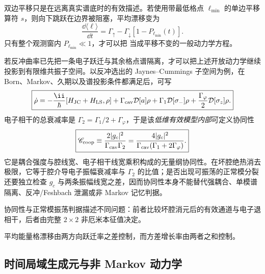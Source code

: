 双边平移只是在远离真实谱底时的有效描述。若使用带最低格点 $\ell_{\min}$ 的单边平移算符 $s$，则向下跳跃在边界被阻塞，平均漂移变为
\[
\frac{\dd\langle\ell\rangle}{\dd t}
=\Gamma_\uparrow
-\Gamma_\downarrow[1-P_{\ell_{\min}}(t)].
\]
只有整个观测窗内 $P_{\ell_{\min}}\ll1$，才可以把 当成平移不变的一般动力学方程。

若反冲曲率已先把一条电子跃迁与其余格点谱隔离，才可以把上述开放动力学继续投影到有限维共振子空间。以反冲选出的 Jaynes--Cummings 子空间为例，在 Born、Markov、久期以及谱投影条件都满足后，可写
\begin{equation}
\boxed{
\dot\rho
=-\frac{\ii}{\hbar}[H_{\rm JC}+H_{\rm LS},\rho]
+\Gamma_{\rm cav}\mathcal D[a]\rho
+\Gamma_1\mathcal D[\sigma_-]\rho
+\frac{\Gamma_\varphi}{2}\mathcal D[\sigma_z]\rho.}
\label{eq:open_jc_effective_master_equation}
\end{equation}
电子相干的总衰减率是 $\Gamma_2=\Gamma_1/2+\Gamma_\varphi$，于是该\emph{低维有效模型内部}可定义协同性
\begin{equation}
\boxed{
\mathscr C_{\rm coop}\equiv\frac{2|g_c|^2}{\Gamma_{\rm cav}\Gamma_2}
=\frac{4|g_c|^2}{\Gamma_{\rm cav}(\Gamma_1+2\Gamma_\varphi)}.}
\label{eq:open_jc_cooperativity}
\end{equation}
它是耦合强度与腔线宽、电子相干线宽乘积构成的无量纲协同性。在坏腔绝热消去极限，它等于腔介导电子振幅衰减率与 $\Gamma_2$ 的比值；是否出现可振荡的正常模分裂还要独立检查 $g_c$ 与两条振幅线宽之差，因而协同性本身不能替代强耦合、单模谱隔离、反冲/Feshbach 泄漏或非 Markov 记忆判据。

协同性与正常模振荡判据描述不同问题：前者比较坏腔消元后的有效通道与电子退相干，后者由完整 $2\times2$ 非厄米本征值决定。

平均能量格漂移由两方向跃迁率之差控制，而方差增长率由两者之和控制。




\subsection{时间局域生成元与非 Markov 动力学}

